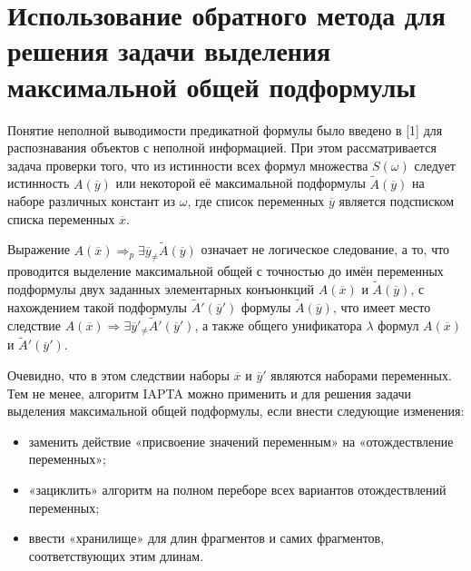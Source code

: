 \documentclass{spisok-article}
\begin{document}
\section{Использование обратного метода для решения задачи выделения максимальной общей подформулы}

Понятие неполной выводимости предикатной формулы было введено в [1] для распознавания объектов с неполной информацией. При этом рассматривается задача проверки того, что из истинности всех формул множества $S(\omega)$ следует истинность $A(\overline{y})$  или некоторой её максимальной подформулы $\tilde A(\overline{y})$ на наборе различных констант из $\omega$, где список переменных $\overline{y}$  является подсписком списка переменных $\overline{x}$.

Выражение  $ A(\overline{x}) \Rightarrow_p \exists \overline{y}_{\neq} \tilde A(\overline{y})$ означает не логическое следование, а то, что проводится выделение максимальной общей с точностью до имён переменных подформулы двух заданных элементарных конъюнкций  $A(\overline{x})$ и $\tilde A(\overline{y})$, с нахождением такой подформулы $\tilde A'(\overline{y}')$ формулы $\tilde A(\overline{y})$, что имеет место следствие $ A(\overline{x}) \Rightarrow \exists \overline{y}'_{\neq} \tilde A'(\overline{y}')$, а также общего унификатора $\lambda$ формул $A(\overline{x})$ и $\tilde A'(\overline{y}')$.

Очевидно, что в этом следствии наборы $\overline{x}$ и $\overline{y}'$ являются наборами переменных. Тем не менее, алгоритм IAPTA можно применить и для решения задачи выделения максимальной общей подформулы, если внести следующие изменения:

\begin{itemize}
\item
  заменить действие «присвоение значений переменным» на «отождествление переменных»;
\item
  «зациклить» алгоритм на полном переборе всех вариантов отождествлений переменных;
\item
  ввести «хранилище» для длин фрагментов и самих фрагментов, соответствующих этим длинам.
\end{itemize}
\end{document}
